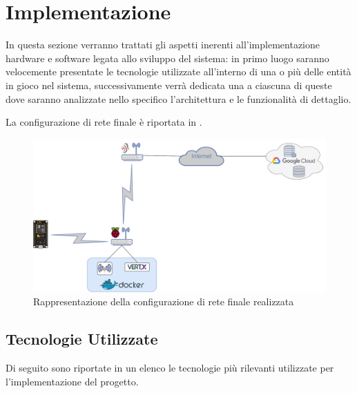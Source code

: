 \section{Implementazione}\label{sec:implementazione}

In questa sezione verranno trattati gli aspetti inerenti all'implementazione hardware e software legata allo sviluppo del sistema:
in primo luogo saranno velocemente presentate le tecnologie utilizzate all'interno di una o più delle entità in gioco nel sistema,
successivamente verrà dedicata una  a ciascuna di queste dove saranno analizzate nello specifico l'architettura e le funzionalità di dettaglio.

La configurazione di rete finale è riportata in .

\begin{figure}[H]
  \centering
  \includegraphics[width=\textwidth]{res/out/network.pdf}
  \caption{Rappresentazione della configurazione di rete finale realizzata}%
  \label{fig:network}
\end{figure}

\subsection{Tecnologie Utilizzate}

Di seguito sono riportate in un elenco le tecnologie più rilevanti utilizzate per l'implementazione del progetto.


